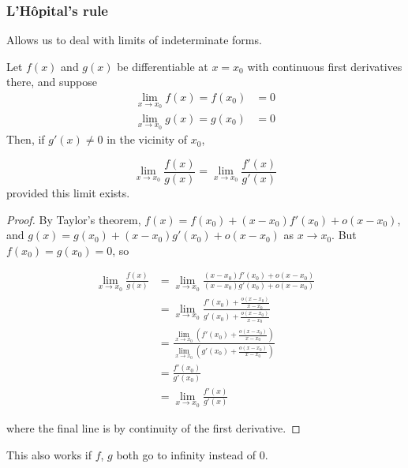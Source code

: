 \documentclass{../../template/note}
\begin{document}
    \subsubsection{L'H\^opital's rule}

    Allows us to deal with limits of indeterminate forms.

    \begin{theorem}
        Let \(f(x)\) and \(g(x)\) be differentiable at \(x=x_0\) with continuous first derivatives there, and suppose
        \begin{align*}
            \lim_{x \to x_0}f(x) = f(x_0) &= 0 \\
            \lim_{x \to x_0}g(x) = g(x_0) &= 0
        \end{align*}
        Then, if \(g'(x) \neq 0\) in the vicinity of \(x_0\),

        \[
            \lim_{x \to x_0} \frac{f(x)}{g(x)} = \lim_{x \to x_0} \frac{f'(x)}{g'(x)}
        \]
        provided this limit exists.
        
    \end{theorem}
    
    \begin{proof}
        By Taylor's theorem, \(f(x) = f(x_0) + (x-x_0)f'(x_0) + o(x-x_0)\), and \(g(x) = g(x_0) + (x-x_0)g'(x_0) + o(x-x_0)\) as \(x \to x_0\). But \(f(x_0) = g(x_0) = 0\), so

        \begin{align*}
            \lim_{x \to x_0} \frac{f(x)}{g(x)} &= \lim_{x\to x_0}\frac{(x-x_0)f'(x_0) + o(x-x_0)}{(x-x_0)g'(x_0) + o(x-x_0)} \\
            &= \lim_{x\to x_0}\frac{f'(x_0) + \frac{o(x-x_0)}{x-x_0}}{g'(x_0) + \frac{o(x-x_0)}{x-x_0}} \\
            &= \frac{\lim_{x\to x_0}\left(f'(x_0) + \frac{o(x-x_0)}{x-x_0}\right)}{\lim_{x\to x_0}\left(g'(x_0) + \frac{o(x-x_0)}{x-x_0}\right)} \\
            &= \frac{f'(x_0)}{g'(x_0)} \\
            &= \lim_{x \to x_0} \frac{f'(x)}{g'(x)}
        \end{align*}
        
        where the final line is by continuity of the first derivative.
        
    \end{proof}

    \begin{remark*}
        This also works if \(f\), \(g\) both go to infinity instead of 0.
    \end{remark*}
\end{document}
